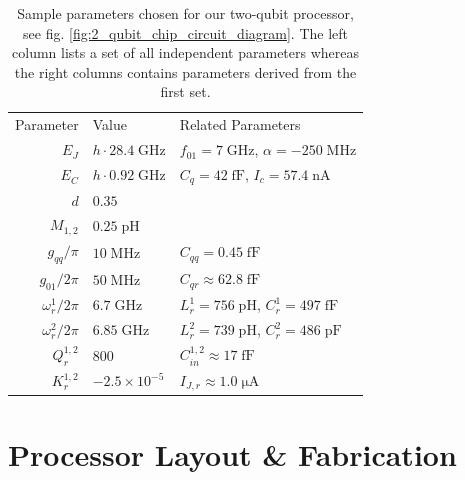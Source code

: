 \begin{table}
	\centering
	\begin{tabularx}{\textwidth}{r|X|l}
	Parameter & Value & Related Parameters \\ [0.3cm]
	$E_J$ & $h\cdot 28.4\;\mathrm{GHz}$ & $f_{01}=7\;\mathrm{GHz}$, $\alpha=-250\;\mathrm{MHz}$ \\ [0.3cm]
	$E_C$ & $h\cdot 0.92\;\mathrm{GHz}$ & $C_q = 42\;\mathrm{fF}$, $I_c = 57.4 \;\mathrm{nA}$\\ [0.3cm]
	$d$ & $0.35$ & \\ [0.3cm]
	$M_{1,2}$ & $0.25\;\mathrm{pH}$ & \\ [0.3cm]
	$g_{qq}/\pi$  & $10\;\mathrm{MHz}$ & $C_{qq}=0.45\;\mathrm{fF}$ \\ [0.3cm]
	$g_{01}/2\pi$  & $50\;\mathrm{MHz}$ & $C_{qr}\approx 62.8 \;\mathrm{fF}$ \\ [0.3cm]
	$\omega_r^{1}/2\pi$ & $6.7\;\mathrm{GHz}$ & $L_r^1 = 756\;\mathrm{pH}$, $C_r^1= 497 \;\mathrm{fF}$ \\ [0.3cm]
	$\omega_r^{2}/2\pi$ & $6.85\;\mathrm{GHz}$ & $L_r^2 = 739\;\mathrm{pH}$, $C_r^2= 486 \;\mathrm{pF}$\\ [0.3cm]
	$Q_r^{1,2}$ & $800$ & $C_{in}^{1,2}\approx 17 \;\mathrm{fF}$ \\ [0.3cm]
	$K_r^{1,2}$ & $-2.5\times 10^{-5}$ & $I_{J,r}\approx 1.0 \;\mathrm{\mu A}$ \\ [0.3cm] 
	\end{tabularx}
	\caption[]{Sample parameters chosen for our two-qubit processor, see fig. \ref{fig:2_qubit_chip_circuit_diagram}. The left column lists a set of all independent parameters whereas the right columns contains parameters derived from the first set.}
	\label{table:processor_parameters}
\end{table}
\section{Processor Layout \& Fabrication}

